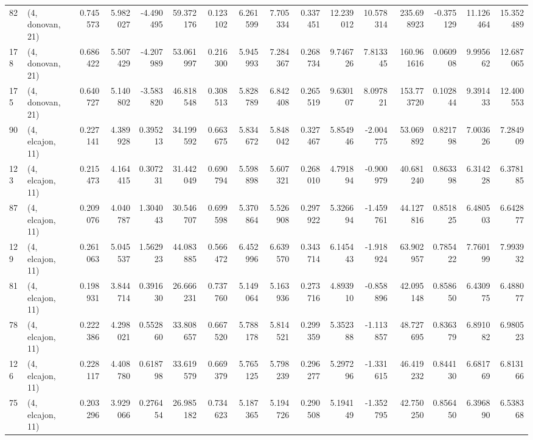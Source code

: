 \begin{tabular}{llrrrrrrrrrrrrrr}
82  &  (4, donovan, 21) &   0.745573 &   5.982027 & -4.490495 &   59.372176 &  0.123102 &   6.261599 &   7.705334 &  0.337451 &  12.239012 &  10.578314 &  235.698923 & -0.375129 &  11.126464 &  15.352489 \\
178 &  (4, donovan, 21) &   0.686422 &   5.507429 & -4.207989 &   53.061997 &  0.216300 &   5.945993 &   7.284367 &  0.268734 &   9.746726 &   7.813345 &  160.961616 &  0.060908 &   9.995662 &  12.687065 \\
175 &  (4, donovan, 21) &   0.640727 &   5.140802 & -3.583820 &   46.818548 &  0.308513 &   5.828789 &   6.842408 &  0.265519 &   9.630107 &   8.097821 &  153.773720 &  0.102844 &   9.391433 &  12.400553 \\
90  &  (4, elcajon, 11) &   0.227141 &   4.389928 &  0.395213 &   34.199592 &  0.663675 &   5.834672 &   5.848042 &  0.327467 &   5.854946 &  -2.004775 &   53.069892 &  0.821798 &   7.003626 &   7.284909 \\
123 &  (4, elcajon, 11) &   0.215473 &   4.164415 &  0.307231 &   31.442049 &  0.690794 &   5.598898 &   5.607321 &  0.268010 &   4.791894 &  -0.900979 &   40.681240 &  0.863398 &   6.314228 &   6.378185 \\
87  &  (4, elcajon, 11) &   0.209076 &   4.040787 &  1.304043 &   30.546707 &  0.699598 &   5.370864 &   5.526908 &  0.297922 &   5.326694 &  -1.459761 &   44.127816 &  0.851825 &   6.480503 &   6.642877 \\
129 &  (4, elcajon, 11) &   0.261063 &   5.045537 &  1.562923 &   44.083885 &  0.566472 &   6.452996 &   6.639570 &  0.343714 &   6.145443 &  -1.918924 &   63.902957 &  0.785422 &   7.760199 &   7.993932 \\
81  &  (4, elcajon, 11) &   0.198931 &   3.844714 &  0.391630 &   26.666231 &  0.737760 &   5.149064 &   5.163936 &  0.273716 &   4.893910 &  -0.858896 &   42.095148 &  0.858650 &   6.430975 &   6.488077 \\
78  &  (4, elcajon, 11) &   0.222386 &   4.298021 &  0.552860 &   33.808657 &  0.667520 &   5.788178 &   5.814521 &  0.299359 &   5.352388 &  -1.113857 &   48.727695 &  0.836379 &   6.891082 &   6.980523 \\
126 &  (4, elcajon, 11) &   0.228117 &   4.408780 &  0.618798 &   33.619579 &  0.669379 &   5.765125 &   5.798239 &  0.296277 &   5.297296 &  -1.331615 &   46.419232 &  0.844130 &   6.681769 &   6.813166 \\
75  &  (4, elcajon, 11) &   0.203296 &   3.929066 &  0.276454 &   26.985182 &  0.734623 &   5.187365 &   5.194726 &  0.290508 &   5.194149 &  -1.352795 &   42.750250 &  0.856450 &   6.396890 &   6.538368 \\

\end{tabular}
